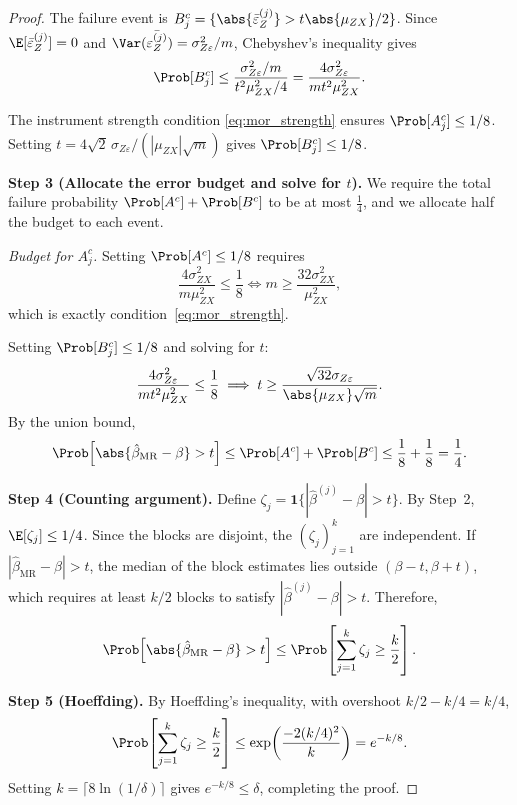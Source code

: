 \begin{proof}
    The failure event is $B_j^c = \{\abs{\bar{\varepsilon}_Z^{(j)}} > t\abs{\mu_{ZX}}/2\}$. Since $\E[\bar{\varepsilon}_Z^{(j)}] = 0$ and $\Var(\bar{\varepsilon_Z^{(j)}}) = \sigma_{Z\varepsilon}^2/m$, Chebyshev's inequality gives
    \[
        \Prob[B_j^c] \leq \frac{\sigma_{Z\varepsilon}^2/m}{t^2\mu_{ZX}^2/4} = \frac{4\sigma_{Z\varepsilon}^2}{mt^2\mu_{ZX}^2}.
    \]

    The instrument strength condition \eqref{eq:mor_strength} ensures $\Prob[A_j^c] \leq 1/8$. Setting $t = 4\sqrt{2}\,\sigma_{Z\varepsilon}/(|\mu_{ZX}|\sqrt{m})$ gives $\Prob[B_j^c] \leq 1/8$.


    \medskip\noindent\textbf{Step 3 (Allocate the error budget and solve for $t$).}
    We require the total failure probability $\Prob[A^c]+\Prob[B^c]$ to be at most $\frac{1}{4}$, and we allocate half the budget to each event.

    \emph{Budget for $A_j^c$.}
    Setting $\Prob[A^c]\leq 1/8$ requires
    \[
        \frac{4\sigma_{ZX}^2}{m\mu_{ZX}^2} \leq \frac{1}{8}
        \iff
        m \geq \frac{32\sigma_{ZX}^2}{\mu_{ZX}^2},
    \]
    which is exactly condition~\eqref{eq:mor_strength}.

    Setting $\Prob[B_j^c]\leq 1/8$ and solving for $t$:
    \[
        \frac{4\sigma_{Z\varepsilon}^2}{mt^2\mu_{ZX}^2} \leq \frac{1}{8} \implies t \geq \frac{\sqrt{32}\sigma_{Z\varepsilon}}{\abs{\mu_{ZX}}\sqrt{m}}.
    \]
    By the union bound,
    \[
        \Prob\!\left[\abs{\hat{\beta}_{\mathrm{MR}}-\beta} > t\right] \leq \Prob[A^c] + \Prob[B^c] \leq \frac{1}{8} + \frac{1}{8} = \frac{1}{4}.
    \]

\medskip\noindent\textbf{Step 4 (Counting argument).} Define $\zeta_j = \mathbf{1}\{|\hat{\beta}^{(j)} - \beta| > t\}$. By Step~2, $\E[\zeta_j] \leq 1/4$. Since the blocks are disjoint, the $(\zeta_j)_{j=1}^{k}$ are independent. If $|\hat{\beta}_{\mathrm{MR}} - \beta| > t$, the median of the block estimates lies outside $(\beta - t, \beta + t)$, which requires at least $k/2$ blocks to satisfy $|\hat{\beta}^{(j)} - \beta| > t$. Therefore,
\[
    \Prob\!\left[\abs{\hat{\beta}_{\mathrm{MR}} - \beta} > t\right] \leq \Prob\!\left[\sum_{j=1}^{k}\zeta_j \geq \frac{k}{2}\right].
\]

\medskip\noindent\textbf{Step 5 (Hoeffding).} By Hoeffding's inequality, with overshoot $k/2 - k/4 = k/4$,
\[
    \Prob\!\left[\sum_{j=1}^{k}\zeta_j \geq \frac{k}{2}\right] \leq \exp\!\left(\frac{-2(k/4)^2}{k}\right) = e^{-k/8}.
\]
Setting $k = \lceil 8\ln(1/\delta)\rceil$ gives $e^{-k/8} \leq \delta$, completing the proof.
\end{proof}


